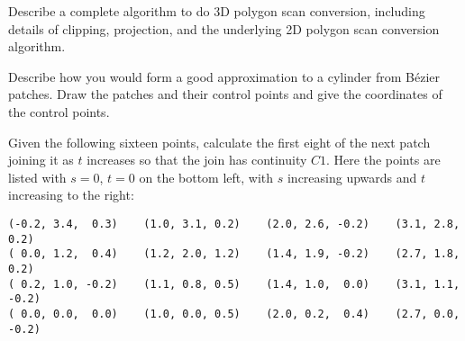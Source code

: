 \documentclass{supervision}
\begin{document}
\begin{questions}
  \question

  \question Describe a complete algorithm to do 3D polygon scan conversion,
    including details of clipping, projection, and the underlying 2D polygon
    scan conversion algorithm.
    \begin{solution}
    \end{solution}

  \question Describe how you would form a good approximation to a cylinder
    from Bézier patches. Draw the patches and their control points and give
    the coordinates of the control points.
    \begin{solution}
    \end{solution}

  \question Given the following sixteen points, calculate the first eight of
    the next patch joining it as $t$ increases so that the join has continuity
    $C1$. Here the points are listed with $s=0$, $t=0$ on the bottom left,
    with $s$ increasing upwards and $t$ increasing to the right:
    \begin{Verbatim}[fontsize=\scriptsize]
(-0.2, 3.4,  0.3)    (1.0, 3.1, 0.2)    (2.0, 2.6, -0.2)    (3.1, 2.8,  0.2)
( 0.0, 1.2,  0.4)    (1.2, 2.0, 1.2)    (1.4, 1.9, -0.2)    (2.7, 1.8,  0.2)
( 0.2, 1.0, -0.2)    (1.1, 0.8, 0.5)    (1.4, 1.0,  0.0)    (3.1, 1.1, -0.2)
( 0.0, 0.0,  0.0)    (1.0, 0.0, 0.5)    (2.0, 0.2,  0.4)    (2.7, 0.0, -0.2)
    \end{Verbatim}
    \begin{solution}
    \end{solution}
\end{questions}
\end{document}
